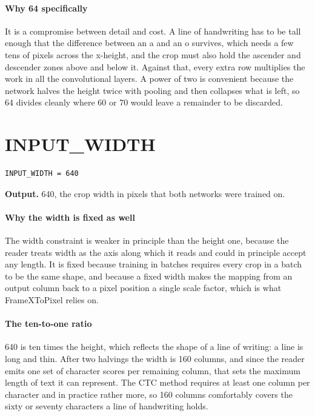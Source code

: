 \paragraph{Why 64 specifically}
It is a compromise between detail and cost. A line of handwriting has to be tall enough that the difference between an a and an o survives, which needs a few tens of pixels across the x-height, and the crop must also hold the ascender and descender zones above and below it. Against that, every extra row multiplies the work in all the convolutional layers. A power of two is convenient because the network halves the height twice with pooling and then collapses what is left, so 64 divides cleanly where 60 or 70 would leave a remainder to be discarded.


\section{INPUT\_WIDTH}
\begin{lstlisting}[style=sig]
INPUT_WIDTH = 640
\end{lstlisting}

\noindent\textbf{Output.} 640, the crop width in pixels that both networks were trained on.


\paragraph{Why the width is fixed as well}
The width constraint is weaker in principle than the height one, because the reader treats width as the axis along which it reads and could in principle accept any length. It is fixed because training in batches requires every crop in a batch to be the same shape, and because a fixed width makes the mapping from an output column back to a pixel position a single scale factor, which is what FrameXToPixel relies on.


\paragraph{The ten-to-one ratio}
640 is ten times the height, which reflects the shape of a line of writing: a line is long and thin. After two halvings the width is 160 columns, and since the reader emits one set of character scores per remaining column, that sets the maximum length of text it can represent. The CTC method requires at least one column per character and in practice rather more, so 160 columns comfortably covers the sixty or seventy characters a line of handwriting holds.


